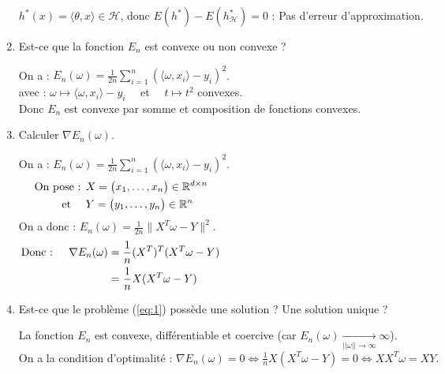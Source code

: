 \documentclass[12pt,a4paper]{article}
\begin{document}
\begin{enumerate}
    $h^*(x) = \langle \theta, x \rangle \in \mathcal{H}$, donc $E(h^*) - E(h^*_\mathcal{H}) = 0$ : Pas d'erreur d'approximation.\\
    

    \color{black}
    \item Est-ce que la fonction $E_n$ est convexe ou non convexe ?
    
    \color{blue}
    On a : $E_n(\omega) = \frac{1}{2n} \sum_{i = 1}^{n} (\langle \omega, x_i \rangle - y_i)^2$.\\
    avec : $\omega \mapsto \langle \omega, x_i \rangle - y_i \quad$ et $\quad t \mapsto t^2$ convexes.\\
    
    Donc $E_n$ est convexe par somme et composition de fonctions convexes.\\

    \color{black}
    \item Calculer $\nabla E_n(\omega)$.
    
    \color{blue}
    On a : $E_n(\omega) = \frac{1}{2n} \sum_{i = 1}^{n} (\langle \omega, x_i \rangle - y_i)^2$.
    \begin{align*}
        \text{On pose : } &X = \begin{pmatrix}
            x_1, \dots , x_n \\
        \end{pmatrix} \in \mathbb{R}^{d \times n} \hspace{14.5cm}\\
        \text{ et } \quad &Y = \begin{pmatrix}
            y_1, \dots , y_n \\
        \end{pmatrix} \in \mathbb{R}^{n}
    \end{align*}
    On a donc : $E_n(\omega) = \frac{1}{2n} \|X^T \omega - Y\|^2$.
    \begin{align*}
        \text{Donc : } \quad \nabla E_n(\omega) &= \frac{1}{n}(X^T)^T(X^T \omega - Y) \hspace{14.5cm}\\
        &= \frac{1}{n} X(X^T \omega - Y)
    \end{align*}


    \color{black}
    \item Est-ce que le problème (\ref{eq:1}) possède une solution ?
    Une solution unique ?

    \color{blue}
    La fonction $E_n$ est convexe, différentiable et coercive (car $E_n(\omega) \xrightarrow[||\omega || \rightarrow \infty]{} \infty$).\\
    On a la condition d'optimalité : $\nabla E_n(\omega) = 0 \Leftrightarrow \frac{1}{n} X(X^T \omega - Y) = 0 \Leftrightarrow X X^T \omega = XY$.\\


\end{enumerate}
\end{document}
